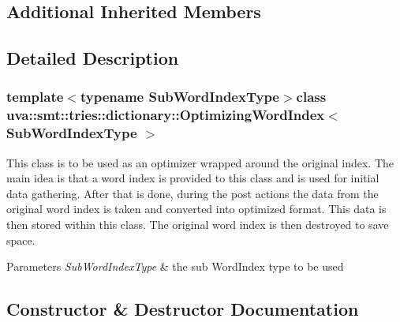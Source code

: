 \subsection*{Additional Inherited Members}


\subsection{Detailed Description}
\subsubsection*{template$<$typename Sub\+Word\+Index\+Type$>$class uva\+::smt\+::tries\+::dictionary\+::\+Optimizing\+Word\+Index$<$ Sub\+Word\+Index\+Type $>$}

This class is to be used as an optimizer wrapped around the original index. The main idea is that a word index is provided to this class and is used for initial data gathering. After that is done, during the post actions the data from the original word index is taken and converted into optimized format. This data is then stored within this class. The original word index is then destroyed to save space. 
\begin{DoxyParams}{Parameters}
{\em Sub\+Word\+Index\+Type} & the sub Word\+Index type to be used \\
\hline
\end{DoxyParams}


\subsection{Constructor \& Destructor Documentation}
\hypertarget{classuva_1_1smt_1_1tries_1_1dictionary_1_1_optimizing_word_index_a3b8aa990378a06935d58fe743749d435}{}
